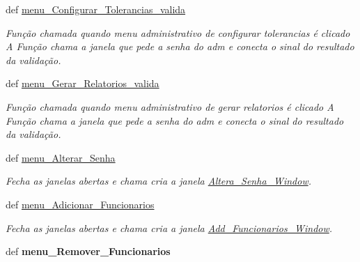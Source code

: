 \begin{DoxyCompactItemize}
def \hyperlink{classview_1_1Controle__De__Acesso__Window_a82104704a47f6ac2b1eeace98512ddb5}{menu\-\_\-\-Configurar\-\_\-\-Tolerancias\-\_\-valida}
\begin{DoxyCompactList}\small\item\em \-Função chamada quando menu administrativo de configurar tolerancias é clicado \-A \-Função chama a janela que pede a senha do adm e conecta o sinal do resultado da validação. \end{DoxyCompactList}\item 
def \hyperlink{classview_1_1Controle__De__Acesso__Window_ad5004cf4a5a736ea936440650557e138}{menu\-\_\-\-Gerar\-\_\-\-Relatorios\-\_\-valida}
\begin{DoxyCompactList}\small\item\em \-Função chamada quando menu administrativo de gerar relatorios é clicado \-A \-Função chama a janela que pede a senha do adm e conecta o sinal do resultado da validação. \end{DoxyCompactList}\item 
\hypertarget{classview_1_1Controle__De__Acesso__Window_a5c62f12a412b1937069557b6bf9368bd}{def \hyperlink{classview_1_1Controle__De__Acesso__Window_a5c62f12a412b1937069557b6bf9368bd}{menu\-\_\-\-Alterar\-\_\-\-Senha}}\label{classview_1_1Controle__De__Acesso__Window_a5c62f12a412b1937069557b6bf9368bd}

\begin{DoxyCompactList}\small\item\em \-Fecha as janelas abertas e chama cria a janela \hyperlink{classview_1_1Altera__Senha__Window}{\-Altera\-\_\-\-Senha\-\_\-\-Window}. \end{DoxyCompactList}\item 
\hypertarget{classview_1_1Controle__De__Acesso__Window_a65850d5812741a4070faed25451a1449}{def \hyperlink{classview_1_1Controle__De__Acesso__Window_a65850d5812741a4070faed25451a1449}{menu\-\_\-\-Adicionar\-\_\-\-Funcionarios}}\label{classview_1_1Controle__De__Acesso__Window_a65850d5812741a4070faed25451a1449}

\begin{DoxyCompactList}\small\item\em \-Fecha as janelas abertas e chama cria a janela \hyperlink{classview_1_1Add__Funcionarios__Window}{\-Add\-\_\-\-Funcionarios\-\_\-\-Window}. \end{DoxyCompactList}\item 
\hypertarget{classview_1_1Controle__De__Acesso__Window_a9604e464614dd25692ea7c7f0a90d1af}{def {\bfseries menu\-\_\-\-Remover\-\_\-\-Funcionarios}}\label{classview_1_1Controle__De__Acesso__Window_a9604e464614dd25692ea7c7f0a90d1af}


\end{DoxyCompactItemize}
